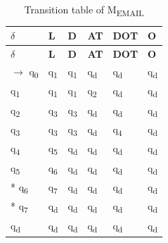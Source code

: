 \documentclass[12pt,a4paper]{article}
\begin{document}
{\small
\begin{longtable}{|>{\raggedright\arraybackslash}p{}|>{\centering\arraybackslash}p{}|>{\centering\arraybackslash}p{}|>{\centering\arraybackslash}p{}|>{\centering\arraybackslash}p{}|>{\centering\arraybackslash}p{}|}
\caption[Transition table of MEMAIL]{Transition table of M\textsubscript{EMAIL}}\label{tab:em_delta}\\
\hline
\rowcolor{hdr}\textbf{\ensuremath{\delta}} & \textbf{L} & \textbf{D} & \textbf{AT} & \textbf{DOT} & \textbf{O}\\ \hline
\endfirsthead
\hline
\rowcolor{hdr}\textbf{\ensuremath{\delta}} & \textbf{L} & \textbf{D} & \textbf{AT} & \textbf{DOT} & \textbf{O}\\ \hline
\endhead
\ensuremath{\rightarrow} q\textsubscript{0} & q\textsubscript{1} & q\textsubscript{1} & q\textsubscript{d} & q\textsubscript{d} & q\textsubscript{d}\\ \hline
q\textsubscript{1} & q\textsubscript{1} & q\textsubscript{1} & q\textsubscript{2} & q\textsubscript{d} & q\textsubscript{d}\\ \hline
q\textsubscript{2} & q\textsubscript{3} & q\textsubscript{3} & q\textsubscript{d} & q\textsubscript{d} & q\textsubscript{d}\\ \hline
q\textsubscript{3} & q\textsubscript{3} & q\textsubscript{3} & q\textsubscript{d} & q\textsubscript{4} & q\textsubscript{d}\\ \hline
q\textsubscript{4} & q\textsubscript{5} & q\textsubscript{d} & q\textsubscript{d} & q\textsubscript{d} & q\textsubscript{d}\\ \hline
q\textsubscript{5} & q\textsubscript{6} & q\textsubscript{d} & q\textsubscript{d} & q\textsubscript{d} & q\textsubscript{d}\\ \hline
* q\textsubscript{6} & q\textsubscript{7} & q\textsubscript{d} & q\textsubscript{d} & q\textsubscript{d} & q\textsubscript{d}\\ \hline
* q\textsubscript{7} & q\textsubscript{d} & q\textsubscript{d} & q\textsubscript{d} & q\textsubscript{d} & q\textsubscript{d}\\ \hline
q\textsubscript{d} & q\textsubscript{d} & q\textsubscript{d} & q\textsubscript{d} & q\textsubscript{d} & q\textsubscript{d}\\ \hline
\end{longtable}}
\end{document}
